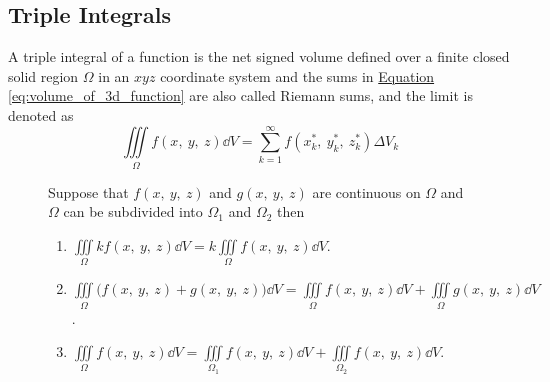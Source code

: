 \documentclass{article}
\begin{document}
\subsection{Triple Integrals}
\begin{definition}
    A triple integral of a function is the net signed volume
    defined over a finite closed solid region $\Omega$ in an $xyz$ coordinate system and the sums in
    \hyperref[eq:volume_of_3d_function]{Equation \ref{eq:volume_of_3d_function}}
    are also called Riemann sums, and the limit is denoted as
    \begin{equation*}
        \iiint\limits_{\Omega} f(x,\: y,\: z)  \dd{V}
        = \sum_{k=1}^{\infty} f(x_k^\ast,\: y_k^\ast,\: z_k^\ast) \Delta V_k
    \end{equation*}
\end{definition}
\begin{figure}[H]
	\begin{mdframed}[style=exampledefault,frametitle={Properties of Triple Integrals}]
		\begin{theorem}
            Suppose that $f(x,\: y,\: z) $ and $g(x,\: y,\: z)$ are continuous on $\Omega$
            and $\Omega$ can be subdivided into $\Omega_1$ and $\Omega_2$ then
			\begin{enumerate}[label=\normalfont\alph*)]
				\item $\displaystyle\iiint\limits_\Omega kf(x,\: y,\: z) \dd{V}
                    = k\iiint\limits_\Omega f(x,\: y,\: z) \dd{V}$.
				\item $\displaystyle\iiint\limits_\Omega \bigl(f(x,\: y,\: z) + g(x,\: y,\: z)\bigr) \dd{V}
                    = \iiint\limits_\Omega f(x,\: y,\: z) \dd{V} + \iiint\limits_\Omega g(x,\: y,\: z) \dd{V}$.
                \item $\displaystyle\iiint\limits_\Omega f(x,\: y,\: z) \dd{V}
                    = \iiint\limits_{\Omega_1} f(x,\: y,\: z) \dd{V} + \iiint\limits_{\Omega_2} f(x,\: y,\: z) \dd{V}$.
			\end{enumerate}
		\end{theorem}
	\end{mdframed}
\end{figure}
\newpage
\end{document}
